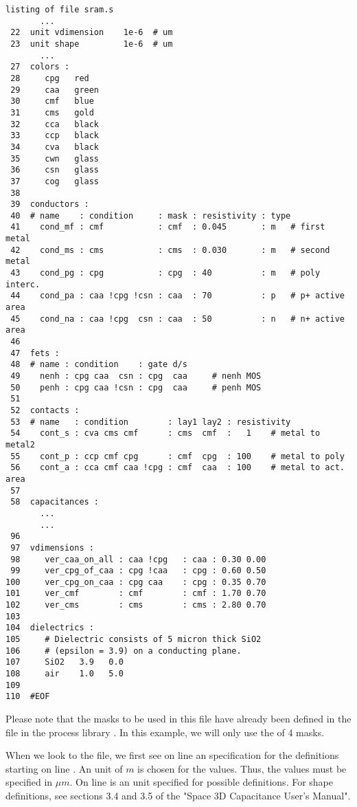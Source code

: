 \small \begin{Verbatim}[frame=single]
listing of file sram.s
       ...
 22  unit vdimension    1e-6  # um
 23  unit shape         1e-6  # um
       ...
 27  colors :
 28     cpg   red
 29     caa   green
 30     cmf   blue
 31     cms   gold
 32     cca   black
 33     ccp   black
 34     cva   black
 35     cwn   glass
 36     csn   glass
 37     cog   glass
 38
 39  conductors :
 40  # name    : condition     : mask : resistivity : type
 41    cond_mf : cmf           : cmf  : 0.045       : m   # first metal
 42    cond_ms : cms           : cms  : 0.030       : m   # second metal
 43    cond_pg : cpg           : cpg  : 40          : m   # poly interc.
 44    cond_pa : caa !cpg !csn : caa  : 70          : p   # p+ active area
 45    cond_na : caa !cpg  csn : caa  : 50          : n   # n+ active area
 46
 47  fets :
 48  # name : condition    : gate d/s
 49    nenh : cpg caa  csn : cpg  caa     # nenh MOS
 50    penh : cpg caa !csn : cpg  caa     # penh MOS
 51
 52  contacts :
 53  # name   : condition        : lay1 lay2 : resistivity
 54    cont_s : cva cms cmf      : cms  cmf  :   1    # metal to metal2
 55    cont_p : ccp cmf cpg      : cmf  cpg  : 100    # metal to poly
 56    cont_a : cca cmf caa !cpg : cmf  caa  : 100    # metal to act. area
 57
 58  capacitances :
       ...
       ...
 96
 97  vdimensions :
 98     ver_caa_on_all : caa !cpg   : caa : 0.30 0.00
 99     ver_cpg_of_caa : cpg !caa   : cpg : 0.60 0.50
100     ver_cpg_on_caa : cpg caa    : cpg : 0.35 0.70
101     ver_cmf        : cmf        : cmf : 1.70 0.70
102     ver_cms        : cms        : cms : 2.80 0.70
103
104  dielectrics :
105     # Dielectric consists of 5 micron thick SiO2
106     # (epsilon = 3.9) on a conducting plane.
107     SiO2   3.9   0.0
108     air    1.0   5.0
109
110  #EOF
\end{Verbatim}
\normalsize
Please note that the masks to be used in this file have already been defined
in the  file in the process library .
In this example, we will only use the  of 4 masks.

When we look to the file, we first see on line  an  specification
for the  definitions starting on line .
An unit of  $m$ is chosen for the values.
Thus, the values must be specified in $\mu m$.
On line  is an unit specified for possible  definitions.
For shape definitions, see sections 3.4 and 3.5 of the "Space 3D Capacitance User's Manual".

